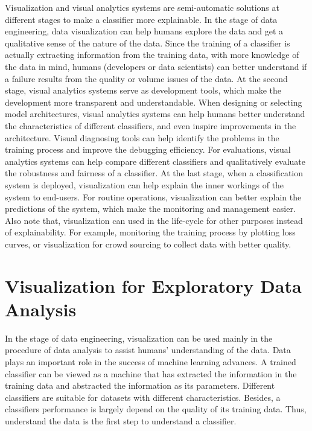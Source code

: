 Visualization and visual analytics systems are semi-automatic solutions at different stages to make a classifier more explainable. In the stage of data engineering, data visualization can help humans explore the data and get a qualitative sense of the nature of the data. Since the training of a classifier is actually extracting information from the training data, with more knowledge of the data in mind, humans (\ie developers or data scientists) can better understand if a failure results from the quality or volume issues of the data. At the second stage, visual analytics systems serve as development tools, which make the development more transparent and understandable. When designing or selecting model architectures, visual analytics systems can help humans better understand the characteristics of different classifiers, and even inspire improvements in the architecture. Visual diagnosing tools can help identify the problems in the training process and improve the debugging efficiency. For evaluations, visual analytics systems can help compare different classifiers and qualitatively evaluate the robustness and fairness of a classifier. At the last stage, when a classification system is deployed, visualization can help explain the inner workings of the system to end-users. For routine operations, visualization can better explain the predictions of the system, which make the monitoring and management easier. Also note that, visualization can used in the life-cycle for other purposes instead of explainability. For example, monitoring the training process by plotting loss curves, or visualization for crowd sourcing to collect data with better quality.




\section{Visualization for Exploratory Data Analysis}

In the stage of data engineering, visualization can be used mainly in the procedure of data analysis to assist humans' understanding of the data. Data plays an important role in the success of machine learning advances. A trained classifier can be viewed as a machine that has extracted the information in the training data and abstracted the information as its parameters. Different classifiers are suitable for datasets with different characteristics. Besides, a classifiers performance is largely depend on the quality of its training data. Thus, understand the data is the first step to understand a classifier.

